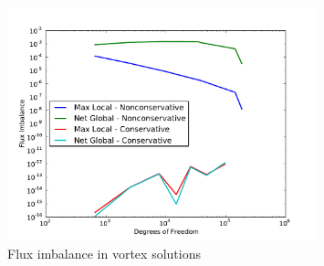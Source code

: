 \documentclass[letterpaper]{article}
\begin{document}
\begin{figure}[p]
\centering
\includegraphics[width=0.8\textwidth]{figs/Vortex/modifiedFlux.pdf}
\caption{Flux imbalance in vortex solutions}
\label{fig:vortex_flux}
\end{figure}
\end{document}
